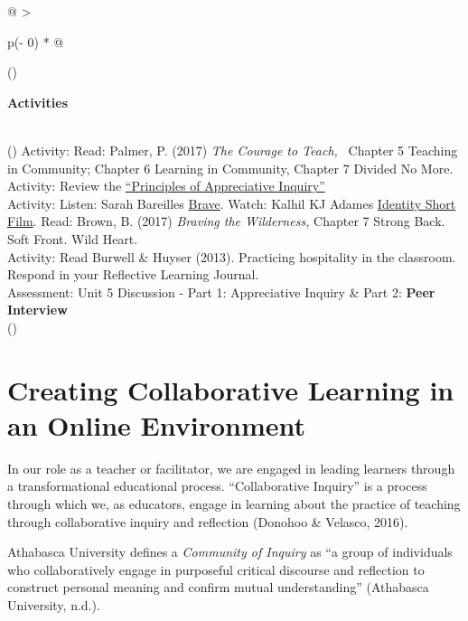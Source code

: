 \documentclass[
]{book}
\begin{document}
\begin{longtable}[]{@{}
  >{\raggedright\arraybackslash}p{(\columnwidth - 0\tabcolsep) * }@{}}
\toprule()
\begin{minipage}[b]{\linewidth}\raggedright
\textbf{Activities}
\end{minipage} \\
\midrule()
\endhead
Activity: Read: Palmer, P. (2017) \emph{The Courage to Teach,} ~Chapter 5 Teaching in Community; Chapter 6 Learning in Community, Chapter 7 Divided No More. \\
Activity: Review the \href{https://appreciativeinquiry.champlain.edu/learn/appreciative-inquiry-introduction/5-classic-principles-ai}{``Principles of Appreciative Inquiry''} \\
Activity: Listen: Sarah Bareilles \href{https://www.youtube.com/watch?v=QUQsqBqxoR4}{Brave}. Watch: Kalhil KJ Adames \href{https://www.youtube.com/watch?v=ikGVWEvUzNM}{Identity Short Film}. Read: Brown, B. (2017) \emph{Braving the Wilderness,} Chapter 7 Strong Back. Soft Front. Wild Heart. \\
Activity: Read Burwell \& Huyser (2013). Practicing hospitality in the classroom. Respond in your Reflective Learning Journal. \\
Assessment: Unit 5 Discussion - Part 1: Appreciative Inquiry \& Part 2: \textbf{Peer Interview} \\
\bottomrule()
\end{longtable}

\hypertarget{creating-collaborative-learning-in-an-online-environment}{%
\section{Creating Collaborative Learning in an Online Environment}\label{creating-collaborative-learning-in-an-online-environment}}

In our role as a teacher or facilitator, we are engaged in leading learners through a transformational educational process. ``Collaborative Inquiry'' is a process through which we, as educators, engage in learning about the practice of teaching through collaborative inquiry and reflection (Donohoo \& Velasco, 2016).

Athabasca University defines a \emph{Community of Inquiry} as ``a group of individuals who collaboratively engage in purposeful critical discourse and reflection to construct personal meaning and confirm mutual understanding'' (Athabasca University, n.d.).
\end{document}

